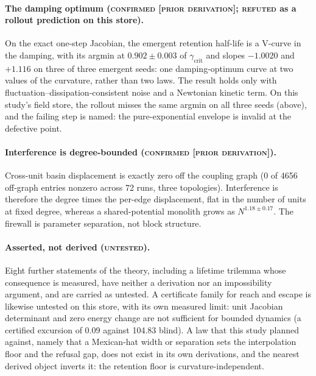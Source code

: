 \documentclass{article} %
\begin{document}
\paragraph{The damping optimum (\textsc{confirmed [prior derivation]}; \textsc{refuted} as a
rollout prediction on this store).} On the exact one-step Jacobian, the emergent retention
half-life is a V-curve in the damping, with its argmin at $0.902\pm0.003$ of
$\gamma_{\text{crit}}$ and slopes $-1.0020$ and $+1.116$ on three of three emergent seeds: one
damping-optimum curve at two values of the curvature, rather than two laws.
The result holds only with fluctuation--dissipation-consistent noise and a Newtonian kinetic term.
On this study's field store, the rollout misses the same argmin on all three seeds (above), and the
failing step is named: the pure-exponential envelope is invalid at the defective point.

\paragraph{Interference is degree-bounded (\textsc{confirmed [prior derivation]}).} Cross-unit
basin displacement is exactly zero off the coupling graph (0 of 4656 off-graph entries nonzero
across 72 runs, three topologies). Interference is therefore the degree times the per-edge
displacement, flat in the number of units at fixed degree, whereas a shared-potential monolith
grows as $N^{1.18\pm0.17}$. The firewall is parameter separation, not block structure.

\paragraph{Asserted, not derived (\textsc{untested}).} Eight further statements of the theory,
including a lifetime trilemma whose consequence is measured, have neither a derivation nor an
impossibility argument, and are carried as untested. A certificate family for reach and escape is
likewise untested on this store, with its own measured limit: unit Jacobian determinant and zero
energy change are not sufficient for bounded dynamics (a certified excursion of 0.09 against
104.83 blind). %
A law that this study planned against, namely that a Mexican-hat width or separation sets
the interpolation floor and the refusal gap, does not exist in its own derivations, and the
nearest derived object inverts it: the retention floor is curvature-independent. %
\end{document}
